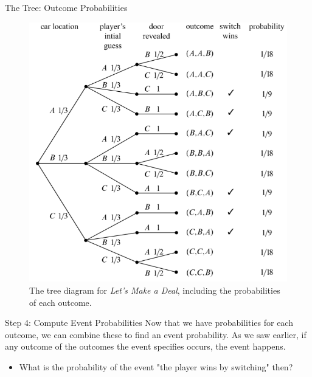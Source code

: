 \documentclass{beamer}
\begin{document}
\begin{frame}{The Tree: Outcome Probabilities}
    \begin{figure}
        \centering
        \includegraphics[scale=.5]{montyhalloutcomeprobs.png}
        \caption{The tree diagram for \textit{Let's Make a Deal}, including the probabilities of each outcome.}
        \label{fig:montyhalloutprob}
    \end{figure}
\end{frame}

\begin{frame}{Step 4: Compute Event Probabilities}
    Now that we have probabilities for each outcome, we can combine these to find an \alert{event probability}. As we saw earlier, if any outcome of the outcomes the event specifies occurs, the event happens.
    \begin{itemize}
        \item What is the probability of the event "the player wins by switching" then? 
    \end{itemize}
\end{frame}
\end{document}
